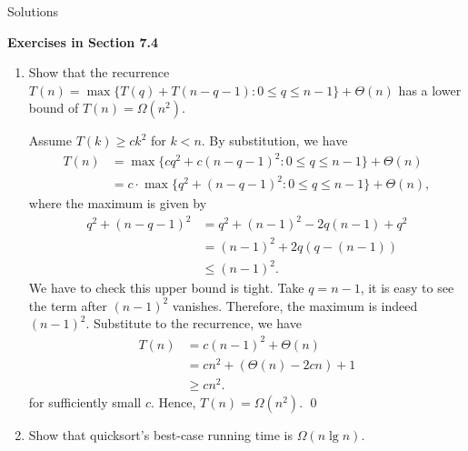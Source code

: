 \documentclass[12pt,reqno]{amsart}
\newif\ifanswer
\begin{document}
\hspace{10.5cm} {\footnotesize Solutions}

\vspace{0.5cm}
\hspace{5.5cm}\textbf{\large Exercises in Section 7.4}
\vspace{0.5cm}

\begin{enumerate}[1.]

\item Show that the recurrence $T(n) = \max{\{T(q) + T(n - q - 1): 0\leq q\leq n - 1\}} + \Theta(n)$ has a lower bound of $T(n) = \Omega(n^2)$.

\ifanswer
{}
Assume $T(k) \geq ck^2$ for $k < n$. By substitution, we have
\begin{align*}
T(n) &= \max{\{cq^2 + c(n - q - 1)^2: 0\leq q\leq n - 1\}} + \Theta(n)\\
&= c\cdot\max{\{q^2 + (n - q - 1)^2: 0\leq q\leq n - 1\}} + \Theta(n),
\end{align*}
where the maximum is given by
\begin{align*}
q^2 + (n - q - 1)^2 &= q^2 + (n - 1)^2 - 2q(n - 1) + q^2\\
&= (n - 1)^2 + 2q(q - (n - 1))\\
&\leq (n - 1)^2.
\end{align*}
We have to check this upper bound is tight. Take $q = n - 1$, it is easy to see the term after $(n - 1)^2$ vanishes. Therefore, the maximum is indeed $(n - 1)^2$. Substitute to the recurrence, we have
\begin{align*}
T(n) &= c(n - 1)^2 + \Theta(n)\\
&= cn^2 + (\Theta(n) - 2cn) + 1\\
&\geq cn^2.
\end{align*}
for sufficiently small $c$. Hence, $T(n) = \Omega(n^2)$. \qed
\vspace{1cm}



\item Show that quicksort's best-case running time is $\Omega(n\lg{n})$.


\end{enumerate}
\end{document}
